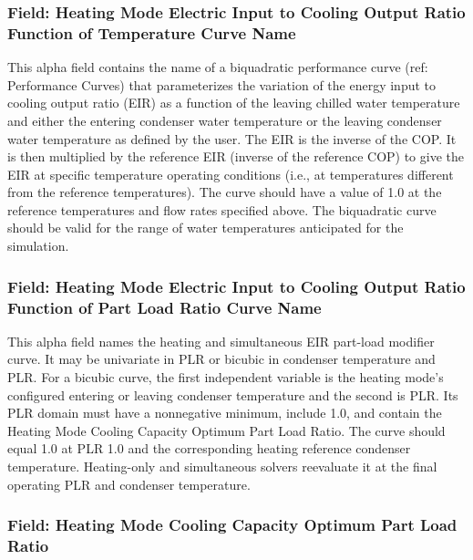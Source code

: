 \subsubsection{Field: Heating Mode Electric Input to Cooling Output Ratio Function of Temperature Curve Name}\label{field-heating-mode-electric-input-to-cooling-output-ratio-function-of-temperature-curve-name}

This alpha field contains the name of a biquadratic performance curve (ref: Performance Curves) that parameterizes the variation of the energy input to cooling output ratio (EIR) as a function of the leaving chilled water temperature and either the entering condenser water temperature or the leaving condenser water temperature as defined by the user. The EIR is the inverse of the COP. It is then multiplied by the reference EIR (inverse of the reference COP) to give the EIR at specific temperature operating conditions (i.e., at temperatures different from the reference temperatures). The curve should have a value of 1.0 at the reference temperatures and flow rates specified above. The biquadratic curve should be valid for the range of water temperatures anticipated for the simulation.

\subsubsection{Field: Heating Mode Electric Input to Cooling Output Ratio Function of Part Load Ratio Curve Name}\label{field-heating-mode-electric-input-to-cooling-output-ratio-function-of-part-load-ratio-curve-name}

This alpha field names the heating and simultaneous EIR part-load modifier curve. It may be univariate in PLR or bicubic in condenser temperature and PLR. For a bicubic curve, the first independent variable is the heating mode's configured entering or leaving condenser temperature and the second is PLR. Its PLR domain must have a nonnegative minimum, include 1.0, and contain the Heating Mode Cooling Capacity Optimum Part Load Ratio. The curve should equal 1.0 at PLR 1.0 and the corresponding heating reference condenser temperature. Heating-only and simultaneous solvers reevaluate it at the final operating PLR and condenser temperature.

\subsubsection{Field: Heating Mode Cooling Capacity Optimum Part Load Ratio}\label{field-heating-mode-cooling-capacity-optimum-part-load-ratio}

